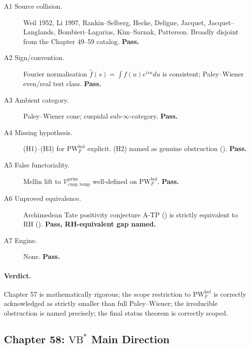 \begin{description}
\item[A1 Source collision.] Weil 1952, Li 1997, Rankin--Selberg,
Hecke, Deligne, Jacquet, Jacquet--Langlands, Bombieri--Lagarias,
Kim--Sarnak, Patterson. Broadly disjoint from the Chapter 49--59 catalog.
\textbf{Pass.}
\item[A2 Sign/convention.] Fourier normalisation
\(\widehat{f}(s)=\int f(u)e^{isu}du\) is consistent; Paley--Wiener
even/real test class. \textbf{Pass.}
\item[A3 Ambient category.] Paley--Wiener cone; cuspidal
sub-\(\infty\)-category. \textbf{Pass.}
\item[A4 Missing hypothesis.] (H1)--(H3) for
\(\mathrm{PW}^{\mathrm{hol}}_{F}\) explicit. (H2) named as genuine
obstruction ().
\textbf{Pass.}
\item[A5 False functoriality.] Mellin lift to
\(\mathcal{V}^{\mathrm{prim}}_{\mathrm{cusp,temp}}\) well-defined on
\(\mathrm{PW}^{\mathrm{hol}}_{F}\). \textbf{Pass.}
\item[A6 Unproved equivalence.] Archimedean Tate positivity
conjecture A-TP ()
is strictly equivalent to RH ().
\textbf{Pass, RH-equivalent gap named.}
\item[A7 Engine.] None. \textbf{Pass.}
\end{description}

\paragraph{Verdict.} Chapter 57 is mathematically rigorous; the
scope restriction to \(\mathrm{PW}^{\mathrm{hol}}_{F}\) is correctly
acknowledged as strictly smaller than full Paley--Wiener; the
irreducible obstruction is named precisely; the final status theorem
is correctly scoped.

\subsection{Chapter 58: \(\mathrm{VB}^{*}\) Main Direction}
\label{v4-arith:w6-j:ch58}

